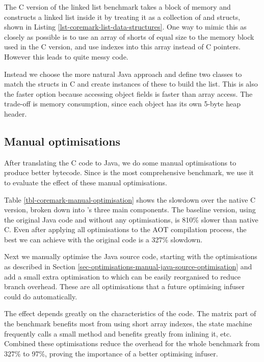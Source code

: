 The C version of the linked list benchmark takes a block of memory and constructs a linked list inside it by treating it as a collection of  and  structs, shown in Listing \ref{lst-coremark-list-data-structures}. One way to mimic this as closely as possible is to use an array of shorts of equal size to the memory block used in the C version, and use indexes into this array instead of C pointers. However this leads to quite messy code.

Instead we choose the more natural Java approach and define two classes to match the structs in C and create instances of these to build the list. This is also the faster option because accessing object fields is faster than array access. The trade-off is memory consumption, since each object has its own 5-byte heap header.


\subsection{Manual optimisations}
\label{sec-evaluation-manual-optimisations}
After translating the C code to Java, we do some manual optimisations to produce better bytecode. Since  is the most comprehensive benchmark, we use it to evaluate the effect of these manual optimisations.



Table \ref{tbl-coremark-manual-optimisation} shows the slowdown over the native C version, broken down into 's three main components. The baseline version, using the original Java code and without any optimisations, is 810\% slower than native C. Even after applying all optimisations to the AOT compilation process, the best we can achieve with the original code is a 327\% slowdown.

Next we manually optimise the Java source code, starting with the optimisations as described in Section \ref{sec-optimisations-manual-java-source-optimisation} and add a small extra optimisation to  which can be easily reorganised to reduce branch overhead. These are all optimisations that a future optimising infuser could do automatically.

The effect depends greatly on the characteristics of the code. The matrix part of the benchmark benefits most from using short array indexes, the state machine frequently calls a small method and benefits greatly from inlining it, etc. Combined these optimisations reduce the overhead for the whole benchmark from 327\% to 97\%, proving the importance of a better optimising infuser.

